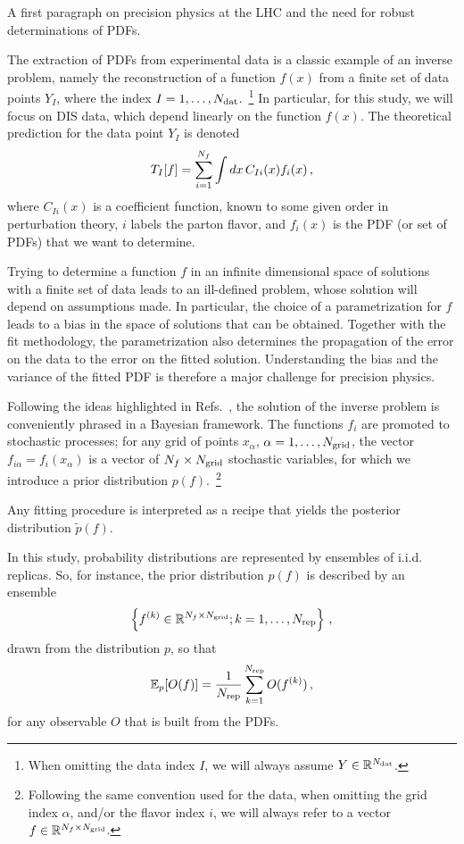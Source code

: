 

A first paragraph on precision physics at the LHC and the need for robust determinations of PDFs.

The extraction of PDFs from experimental data is a classic example of an inverse problem,
namely the reconstruction of a function $f(x)$ from a finite set of data points
$Y_I$, where the index $I=1, \ldots, N_{\mathrm{dat}}$.~\footnote{When omitting the data index $I$, we will always
assume $Y \in \mathbb{R}^{N_{\mathrm{dat}}}$.} In particular, for this study, we will focus
on DIS data, which depend
linearly on the function $f(x)$. The theoretical prediction for the data point $Y_I$ is denoted
\begin{equation}
    \label{eq:TheoryPred}
    T_I[f] = \sum_{i=1}^{N_{f}} \int dx\, C_{Ii}(x) f_{i}(x)\, ,
\end{equation}
where $C_{Ii}(x)$ is a coefficient function, known to some given order in perturbation theory,
$i$ labels the parton flavor, and $f_i(x)$
is the PDF (or set of PDFs) that we want to determine.

Trying to determine a function $f$ in an infinite dimensional space of solutions with a finite
set of data leads to an ill-defined problem, whose solution will depend on assumptions made.
In particular, the choice of a parametrization for $f$ leads to a bias in the space
of solutions that can be obtained. Together with the fit methodology, the parametrization also
determines the propagation of the error on the data to the error on the fitted solution. Understanding
the bias and the variance of the fitted PDF is therefore a major challenge for precision physics.

Following the ideas highlighted in Refs.~\cite{DelDebbio:2021whr,Candido:2024hjt}, the solution
of the inverse problem is conveniently phrased in
a Bayesian framework. The functions $f_i$ are promoted to stochastic processes; for any grid
of points $x_{\alpha}$, $\alpha=1, \ldots, N_{\mathrm{grid}}$, the vector $f_{i\alpha}=f_{i}(x_{\alpha})$ is a
vector of $N_{f}\times N_{\mathrm{grid}}$ stochastic variables, for which we introduce a prior distribution $p(f)$.~\footnote{Following
the same convention used for the data, when omitting the grid index $\alpha$, and/or the flavor index $i$, we will always refer to a
vector $f \in \mathbb{R}^{N_{f}\times N_{\mathrm{grid}}}$.}

Any fitting procedure is interpreted as a recipe that yields the posterior distribution
$\tilde{p}(f)$.

In this study, probability distributions are represented by ensembles of i.i.d. replicas.
So, for instance, the prior distribution $p(f)$ is described by an ensemble
\begin{equation}
    \label{eq:RepDef}
    \left\{f^{(k)} \in \mathbb{R}^{N_{f}\times N_{\mathrm{grid}}}; k=1, \ldots, N_{\rm rep}\right\}\, ,
\end{equation}
drawn from the distribution $p$, so that
\begin{equation}
    \label{eq:ReplicaEnsemble}
    \mathbb{E}_{p}[O(f)] = \frac{1}{N_{\rm rep}} \sum_{k=1}^{N_{\rm rep}} O(f^{(k)})\, ,
\end{equation}
for any observable $O$ that is built from the PDFs.

